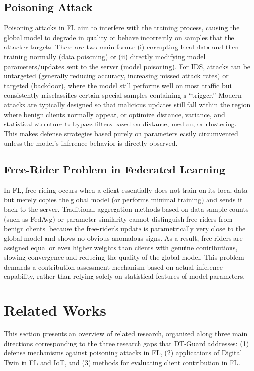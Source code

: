 \documentclass[runningheads]{llncs}
\begin{document}
\subsection{Poisoning Attack}

Poisoning attacks in FL aim to interfere with the training process, causing the global model to degrade in quality or behave incorrectly on samples that the attacker targets. There are two main forms: (i) corrupting local data and then training normally (data poisoning) or (ii) directly modifying model parameters/updates sent to the server (model poisoning). For IDS, attacks can be untargeted (generally reducing accuracy, increasing missed attack rates) or targeted (backdoor), where the model still performs well on most traffic but consistently misclassifies certain special samples containing a ``trigger.'' Modern attacks are typically designed so that malicious updates still fall within the region where benign clients normally appear, or optimize distance, variance, and statistical structure to bypass filters based on distance, median, or clustering. This makes defense strategies based purely on parameters easily circumvented unless the model's inference behavior is directly observed.

\subsection{Free-Rider Problem in Federated Learning}

In FL, free-riding occurs when a client essentially does not train on its local data but merely copies the global model (or performs minimal training) and sends it back to the server. Traditional aggregation methods based on data sample counts (such as FedAvg) or parameter similarity cannot distinguish free-riders from benign clients, because the free-rider's update is parametrically very close to the global model and shows no obvious anomalous signs. As a result, free-riders are assigned equal or even higher weights than clients with genuine contributions, slowing convergence and reducing the quality of the global model. This problem demands a contribution assessment mechanism based on actual inference capability, rather than relying solely on statistical features of model parameters.

\section{Related Works}

This section presents an overview of related research, organized along three main directions corresponding to the three research gaps that DT-Guard addresses: (1) defense mechanisms against poisoning attacks in FL, (2) applications of Digital Twin in FL and IoT, and (3) methods for evaluating client contribution in FL.
\end{document}
